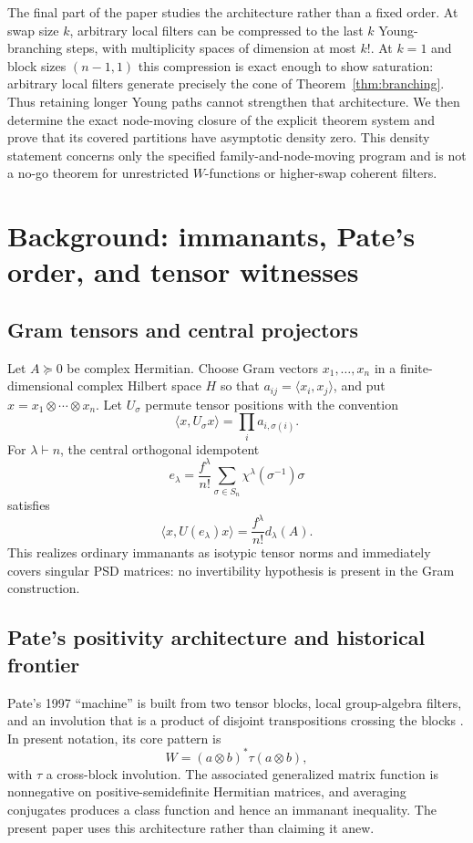\documentclass[11pt]{article}
\theoremstyle{definition}
\begin{document}
The final part of the paper studies the architecture rather than a fixed order.  At swap size $k$, arbitrary local filters can be compressed to the last $k$ Young-branching steps, with multiplicity spaces of dimension at most $k!$.  At $k=1$ and block sizes $(n-1,1)$ this compression is exact enough to show saturation: arbitrary local filters generate precisely the cone of Theorem~\ref{thm:branching}.  Thus retaining longer Young paths cannot strengthen that architecture.  We then determine the exact node-moving closure of the explicit theorem system and prove that its covered partitions have asymptotic density zero.  This density statement concerns only the specified family-and-node-moving program and is not a no-go theorem for unrestricted $W$-functions or higher-swap coherent filters.

\section{Background: immanants, Pate's order, and tensor witnesses}\label{sec:background}
\subsection{Gram tensors and central projectors}
Let $A\succeq0$ be complex Hermitian.  Choose Gram vectors $x_1,\dots,x_n$ in a finite-dimensional complex Hilbert space $H$ so that $a_{ij}=\langle x_i,x_j\rangle$, and put $x=x_1\otimes\cdots\otimes x_n$.  Let $U_\sigma$ permute tensor positions with the convention
\[
 \langle x,U_\sigma x\rangle=\prod_i a_{i,\sigma(i)}.
\]
For $\lambda\vdash n$, the central orthogonal idempotent
\[
 e_\lambda=\frac{f^\lambda}{n!}\sum_{\sigma\in S_n}\chi^\lambda(\sigma^{-1})\sigma
\]
satisfies
\begin{equation}\label{eq:projpairing}
 \langle x,U(e_\lambda)x\rangle=\frac{f^\lambda}{n!}d_\lambda(A).
\end{equation}
This realizes ordinary immanants as isotypic tensor norms and immediately covers singular PSD matrices: no invertibility hypothesis is present in the Gram construction.

\subsection{Pate's positivity architecture and historical frontier}
Pate's 1997 ``machine'' is built from two tensor blocks, local group-algebra filters, and an involution that is a product of disjoint transpositions crossing the blocks \cite{Pate1997}.  In present notation, its core pattern is
\[
 W=(a\otimes b)^*\tau(a\otimes b),
\]
with $\tau$ a cross-block involution.  The associated generalized matrix function is nonnegative on positive-semidefinite Hermitian matrices, and averaging conjugates produces a class function and hence an immanant inequality.  The present paper uses this architecture rather than claiming it anew.
\end{document}

